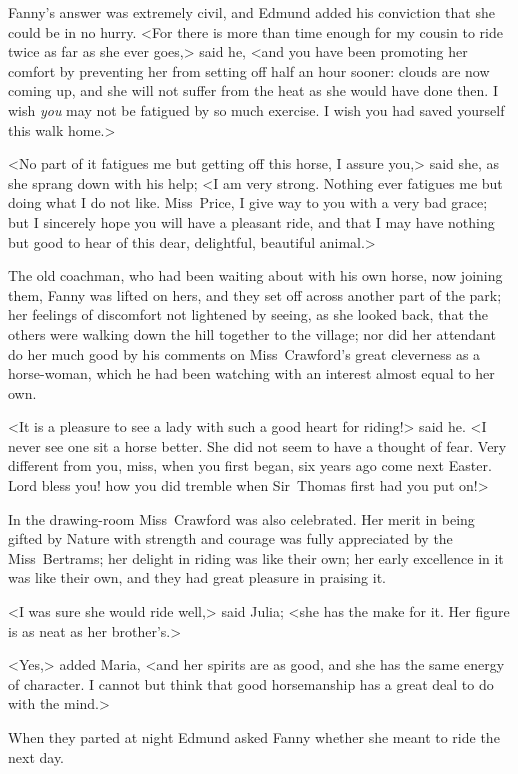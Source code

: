 Fanny's answer was extremely civil, and Edmund added his conviction that she could be in no hurry. <For there is more than time enough for my cousin to ride twice as far as she ever goes,> said he, <and you have been promoting her comfort by preventing her from setting off half an hour sooner: clouds are now coming up, and she will not suffer from the heat as she would have done then. I wish \textit{you}  may not be fatigued by so much exercise. I wish you had saved yourself this walk home.>

<No part of it fatigues me but getting off this horse, I assure you,> said she, as she sprang down with his help; <I am very strong. Nothing ever fatigues me but doing what I do not like. Miss~Price, I give way to you with a very bad grace; but I sincerely hope you will have a pleasant ride, and that I may have nothing but good to hear of this dear, delightful, beautiful animal.>

The old coachman, who had been waiting about with his own horse, now joining them, Fanny was lifted on hers, and they set off across another part of the park; her feelings of discomfort not lightened by seeing, as she looked back, that the others were walking down the hill together to the village; nor did her attendant do her much good by his comments on Miss~Crawford's great cleverness as a horse-woman, which he had been watching with an interest almost equal to her own.

<It is a pleasure to see a lady with such a good heart for riding!> said he. <I never see one sit a horse better. She did not seem to have a thought of fear. Very different from you, miss, when you first began, six years ago come next Easter. Lord bless you! how you did tremble when Sir~Thomas first had you put on!>

In the drawing-room Miss~Crawford was also celebrated. Her merit in being gifted by Nature with strength and courage was fully appreciated by the Miss~Bertrams; her delight in riding was like their own; her early excellence in it was like their own, and they had great pleasure in praising it.

<I was sure she would ride well,> said Julia; <she has the make for it. Her figure is as neat as her brother's.>

<Yes,> added Maria, <and her spirits are as good, and she has the same energy of character. I cannot but think that good horsemanship has a great deal to do with the mind.>

When they parted at night Edmund asked Fanny whether she meant to ride the next day.

